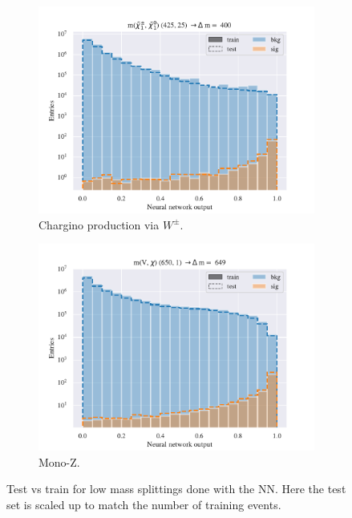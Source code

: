 \begin{figure}[H]
    \begin{subfigure}[t!]{0.49\textwidth}
        \includegraphics[width = \textwidth]{Figures/WW/NN/All_level/High/scaled_train_test_395330.pdf}
        \caption{Chargino production via $W^\pm$.}
        \label{fig:WWNNLow}
    \end{subfigure}
    \begin{subfigure}[t!]{0.49\textwidth}
        \includegraphics[width = \textwidth]{Figures/Mono_Z/ML/NN/All_level/High/scaled_train_test_310617.pdf}
        \caption{Mono-Z.}
        \label{fig:MonoZNNLow}
    \end{subfigure}
    \caption{Test vs train for low mass splittings done with the NN. Here the test set is scaled up to match the number of training events.}
    \label{fig:AllLowNN}
\end{figure}



















